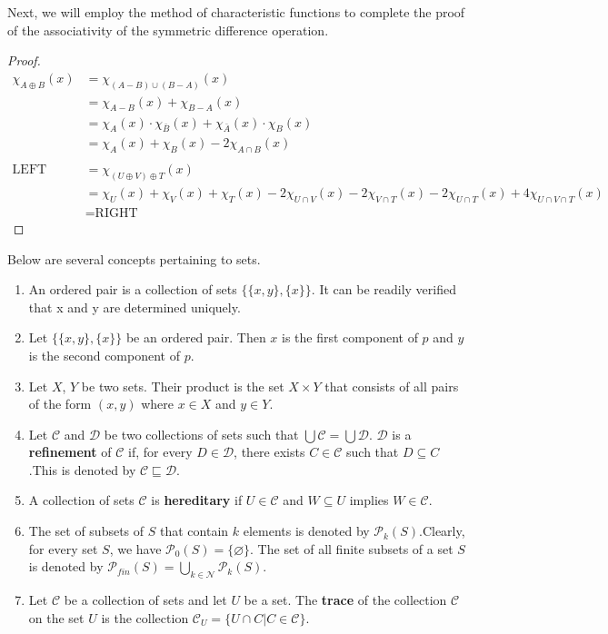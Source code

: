 \documentclass[../main.tex]{subfiles}
\begin{document}
Next, we will employ the method of characteristic functions to complete the proof of the associativity of the symmetric difference operation.

\begin{proof}
\begin{align*}
    \chi_{A\oplus B}(x)&=\chi_{(A-B)\cup(B-A)}(x)\\
    &=\chi_{A-B}(x)+\chi_{B-A}(x)\\
    &=\chi_{A}(x)\cdot\chi_{\bar B}(x)+\chi_{\bar A}(x)\cdot\chi_{B}(x)\\
    &=\chi_A(x)+\chi_B(x)-2\chi_{A\cap B}(x)\\
    \\
    \text{LEFT}&=\chi_{(U\oplus V)\oplus T}(x)\\
    &=\chi_U(x)+\chi_V(x)+\chi_T(x)-2\chi_{U\cap V}(x)-2\chi_{V\cap T}(x)-2\chi_{U\cap T}(x)+4\chi_{U\cap V \cap T}(x)\\
    &=\text{RIGHT}
\end{align*}
\end{proof}

\begin{purple}
\begin{definition}
    Below are several concepts pertaining to sets.

\begin{enumerate}
    \item An ordered pair is a collection of sets $\{\{x,y\},\{x\}\}$. It can be readily verified that x and y are determined uniquely.
    \item Let $\{\{x,y\},\{x\}\}$ be an ordered pair. Then $x$ is the first component of $p$ and $y$ is the second component of $p$.
    \item Let $X$, $Y$ be two sets. Their product is the set $X\times Y$ that consists of all pairs of the form $(x, y)$ where $x\in X$ and $y \in Y$.
    \item Let $\mathcal{C}$ and $\mathcal{D}$ be two collections of sets such that $\bigcup \mathcal{C}=\bigcup \mathcal{D}$. $\mathcal{D}$ is a \textbf{refinement} of $\mathcal{C}$ if, for every $D\in\mathcal{D}$, there exists $C\in\mathcal{C}$ such that $D\subseteq C$.This is denoted by $\mathcal{C}\sqsubseteq \mathcal{D}$.
    \item A collection of sets $\mathcal{C}$ is \textbf{hereditary} if $U\in\mathcal{C}$ and $W \subseteq U$ implies $W\in \mathcal{C}$.
    \item The set of subsets of $S$ that contain $k$ elements is denoted by $\mathcal{P}_k(S)$.Clearly, for every set $S$, we have $\mathcal{P}_0(S)=\{\varnothing\}$. The set of all finite subsets of a set $S$ is denoted by $\mathcal{P}_{fin}(S)=\bigcup_{k\in \mathcal{N}}\mathcal{P}_k(S)$.
    \item Let $\mathcal{C}$ be a collection of sets and let $U$ be a set. The \textbf{trace} of the collection $\mathcal{C}$ on the set $U$ is the collection $\mathcal{C}_U=\{U\cap C| C\in \mathcal{C}\}$.
\end{enumerate}
\end{definition}
\end{purple}
\end{document}
